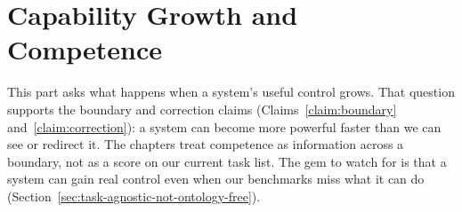\part{Capability Growth and Competence}

This part asks what happens when a system's useful control grows.
That question supports the boundary and correction claims (Claims~\ref{claim:boundary} and~\ref{claim:correction}): a system can become more powerful faster than we can see or redirect it.
The chapters treat competence as information across a boundary, not as a score on our current task list.
The gem to watch for is that a system can gain real control even when our benchmarks miss what it can do (Section~\ref{sec:task-agnostic-not-ontology-free}).





